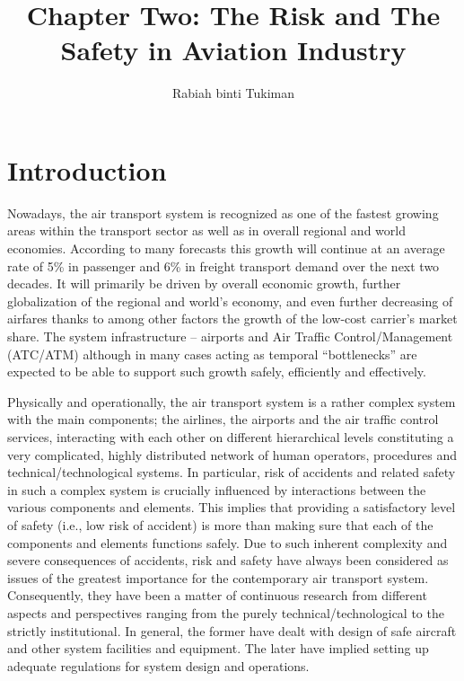 \documentclass[a4paper, 10pt]{article}
\title{Chapter Two: The Risk and The Safety in Aviation Industry}
\author{Rabiah binti Tukiman}
\begin{document}
\maketitle
\section{Introduction}
Nowadays, the air transport system is recognized as one of
the fastest growing areas within the transport sector as well as
in overall regional and world economies. According to many
forecasts this growth will continue at an average rate of 5\% in
passenger and 6\% in freight transport demand over the next
two decades. It will primarily be driven by overall economic
growth, further globalization of the regional and world’s
economy, and even further decreasing of airfares thanks to
among other factors the growth of the low-cost carrier’s market
share. The system infrastructure – airports and Air Traffic
Control/Management (ATC/ATM) although in many cases
acting as temporal “bottlenecks” are expected to be able to
support such growth safely, efficiently and effectively.\par

Physically and operationally, the air transport system is a
rather complex system with the main components; the airlines, the
airports and the air traffic control services, interacting with each
other on different hierarchical levels constituting a very complicated, 
highly distributed network of human operators,
procedures and technical/technological systems. In particular,
risk of accidents and related safety in such a complex system is
crucially influenced by interactions between the various
components and elements. This implies that providing a
satisfactory level of safety (i.e., low risk of accident) is more
than making sure that each of the components and elements
functions safely. Due to such inherent complexity and
severe consequences of accidents, risk and safety have always
been considered as issues of the greatest importance for the
contemporary air transport system. Consequently, they have
been a matter of continuous research from different aspects and
perspectives ranging from the purely technical/technological to
the strictly institutional. In general, the former have dealt with
design of safe aircraft and other system facilities and
equipment. The later have implied setting up adequate
regulations for system design and operations.
\end{document}
